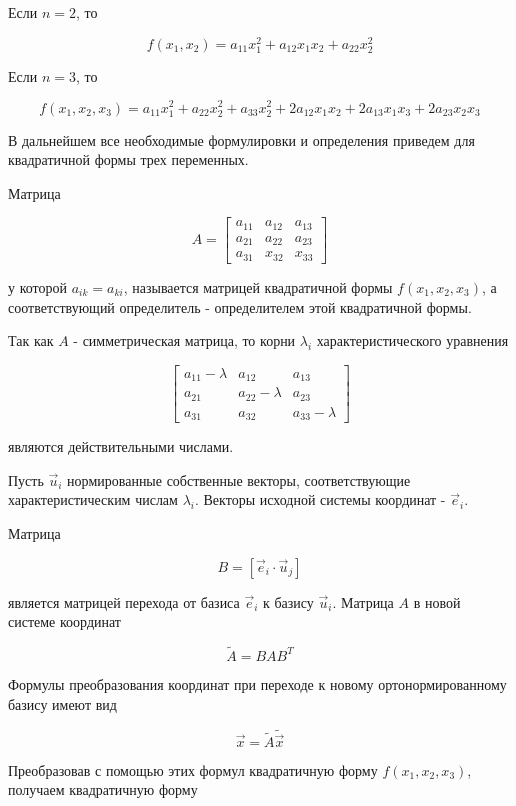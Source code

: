 Если $n = 2$, то 

\[
f \left( x_{1}, x_{2} \right) = a_{11} x^{2}_{1} + a_{12} x_{1} x_{2} + a_{22} x^{2}_{2}
\]

Если $n = 3$, то 

\[
f \left( x_{1}, x_{2}, x_{3} \right) = a_{11} x^{2}_{1} + a_{22} x^{2}_{2} + a_{33} x^{2}_{2} + 2 a_{12} x_{1} x_{2} + 2 a_{13} x_{1} x_{3} + 2 a_{23} x_{2} x_{3}
\]

В дальнейшем все необходимые формулировки и определения приведем для квадратичной формы трех переменных.

Матрица

\[
A =
\begin{bmatrix}
a_{11} & a_{12} & a_{13} \\
a_{21} & a_{22} & a_{23} \\
a_{31} & x_{32} & x_{33}
\end{bmatrix}
\]

у которой $a_{ik} = a_{ki}$, называется матрицей квадратичной формы $f \left( x_{1}, x_{2}, x_{3} \right)$, а соответствующий определитель - определителем этой квадратичной формы.

Так как $A$ - симметрическая матрица, то корни $\lambda_{i}$ характеристического уравнения

\[
\begin{bmatrix}
a_{11} - \lambda & a_{12} & a_{13} \\
a_{21} & a_{22} - \lambda & a_{23} \\
a_{31} & a_{32} & a_{33} - \lambda
\end{bmatrix}
\]

являются действительными числами.

Пусть $\vec{u}_{i}$ нормированные собственные векторы, соответствующие характеристическим числам $\lambda_{i}$. Векторы исходной системы координат - $\vec{e}_{i}$.

Матрица

\[
B = \left[ \vec{e}_{i} \cdot \vec{u}_{j} \right]
\]

является матрицей перехода от базиса $\vec{e}_{i}$ к базису $\vec{u}_{i}$. Матрица $A$ в новой системе координат

\[
\tilde{A} = B A B^{T}
\]

Формулы преобразования координат при переходе к новому ортонормированному базису имеют вид

\[
\vec{x} = \tilde{A} \tilde{\vec{x}}
\]

Преобразовав с помощью этих формул квадратичную форму $f \left( x_{1}, x_{2}, x_{3} \right)$, получаем квадратичную форму


